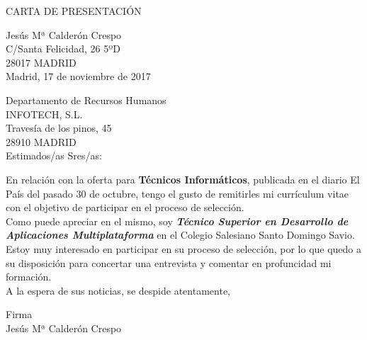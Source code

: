 \documentclass[11pt,a4paper]{article}
\begin{document}
\begin{center}
CARTA DE PRESENTACIÓN
\bigskip
\end{center}
\begin{flushright}
Jesús Mª Calderón Crespo\\
C/Santa Felicidad, 26 5ºD\\
28017 MADRID\\
\bigskip
Madrid, 17 de noviembre de 2017
\bigskip
\end{flushright}
\begin{flushleft}
Departamento de Recursos Humanos\\
INFOTECH, S.L.\\
Travesía de los pinos, 45\\
28910 MADRID\\
\vspace{2cm}
Estimados/as Sres/as:
\end{flushleft}

En relación con la oferta para {\bf Técnicos Informáticos}, publicada en el diario El País del pasado 30 de octubre, tengo el gusto de remitirles mi currículum vitae con el objetivo de participar en el proceso de selección.\\

Como puede apreciar en el mismo, soy {\bf \em Técnico Superior en Desarrollo de Aplicaciones Multiplataforma} en el Colegio Salesiano Santo Domingo Savio.\\

Estoy muy interesado en participar en su proceso de selección, por lo que quedo a su disposición para concertar una entrevista y comentar en profuncidad mi formación.\\

A la espera de sus noticias, se despide atentamente,
\begin{center}
Firma\\
\vspace{3cm}
Jesús Mª Calderón Crespo
\end{center}
\end{document}
